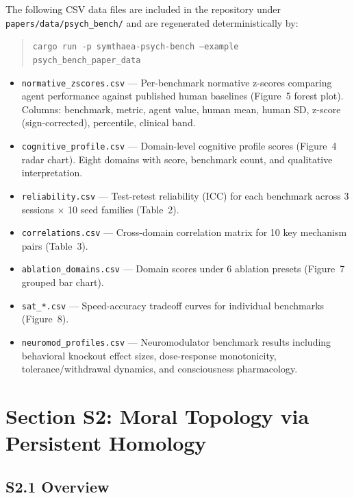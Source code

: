 \documentclass[10pt,landscape]{article}
\begin{document}
The following CSV data files are included in the repository under \texttt{papers/data/psych\_bench/} and are regenerated deterministically by:

\begin{quote}
\texttt{cargo run -p symthaea-psych-bench --example psych\_bench\_paper\_data}
\end{quote}

\begin{itemize}
\item \texttt{normative\_zscores.csv} --- Per-benchmark normative z-scores comparing agent performance against published human baselines (Figure~5 forest plot). Columns: benchmark, metric, agent value, human mean, human SD, z-score (sign-corrected), percentile, clinical band.
\item \texttt{cognitive\_profile.csv} --- Domain-level cognitive profile scores (Figure~4 radar chart). Eight domains with score, benchmark count, and qualitative interpretation.
\item \texttt{reliability.csv} --- Test-retest reliability (ICC) for each benchmark across 3 sessions $\times$ 10 seed families (Table~2).
\item \texttt{correlations.csv} --- Cross-domain correlation matrix for 10 key mechanism pairs (Table~3).
\item \texttt{ablation\_domains.csv} --- Domain scores under 6 ablation presets (Figure~7 grouped bar chart).
\item \texttt{sat\_*.csv} --- Speed-accuracy tradeoff curves for individual benchmarks (Figure~8).
\item \texttt{neuromod\_profiles.csv} --- Neuromodulator benchmark results including behavioral knockout effect sizes, dose-response monotonicity, tolerance/withdrawal dynamics, and consciousness pharmacology.
\end{itemize}


\newpage
\section*{Section S2: Moral Topology via Persistent Homology}

\subsection*{S2.1 Overview}
\end{document}
